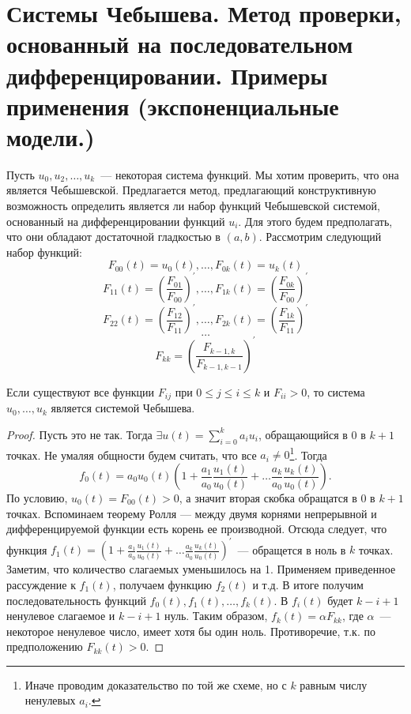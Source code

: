 
\section{Системы Чебышева. Метод проверки, основанный на последовательном дифференцировании. Примеры применения (экспоненциальные модели.)}

Пусть $u_0, u_2,…, u_k$ — некоторая система функций. Мы хотим проверить, что она является Чебышевской.
Предлагается метод, предлагающий конструктивную возможность определить является ли набор функций Чебышевской системой,
основанный на дифференцировании функций $u_i$. Для этого будем предполагать, что они обладают достаточной гладкостью в $(a, b)$.
Рассмотрим следующий набор функций:
$$ F_{00}(t) = u_0(t), …, F_{0k}(t) = u_k(t)$$
$$F_{11}(t) = \left(\frac{F_{01}}{F_{00}}\right)^{'}, …, F_{1k}(t) = \left(\frac{F_{0k}}{F_{00}}\right)^{'}$$
$$F_{22}(t) = \left(\frac{F_{12}}{F_{11}}\right)^{'}, …, F_{2k}(t) = \left(\frac{F_{1k}}{F_{11}}\right)^{'} $$
$$ … $$
$$F_{kk} = \left(\frac{F_{k-1, k}}{F_{k-1, k-1}}\right)^{'}$$
\begin{thm}
\label{seqDerTh}
Если существуют все функции $F_{ij}$ при $0 \le j \le i \le k$ и $F_{ii} > 0$, то система $u_0, …, u_k$ является системой Чебышева.
\end{thm}
\begin{proof}
    Пусть это не так. Тогда $\exists u(t) = \sum \limits_{i=0}^{k} a_i u_i$, обращающийся в 0 в $k+1$ точках. Не умаляя общности будем считать, что все $a_i \neq 0$\footnote{Иначе
    проводим доказательство по той же схеме, но с $k$ равным числу ненулевых $a_i$.}.
Тогда
$$ f_0(t) = a_0u_0(t)\left(1 + \frac{a_1}{a_0} \frac{u_1(t)}{u_0(t)} + … \frac{a_k}{a_0}\frac{u_k(t)}{u_0(t)}\right).$$
По условию, $u_0(t) = F_{00}(t) > 0$, а значит вторая скобка обращатся в 0 в $k+1$ точках. Вспоминаем теорему Ролля — между двумя корнями непрерывной и дифференцируемой функции есть корень ее производной. Отсюда следует, что функция 
$f_1(t) = \left(1 + \frac{a_1}{a_0} \frac{u_1(t)}{u_0(t)} + … \frac{a_k}{a_0}\frac{u_k(t)}{u_0(t)}\right)^{'}$ — обращется в ноль в $k$ точках. Заметим, что количество слагаемых уменьшилось на 1.
Применяем приведенное рассуждение к $f_1(t)$, получаем функцию $f_2(t)$ и т.д. В итоге получим 
последовательность функций $f_0(t), f_1(t), …, f_k(t)$.
В $f_i(t)$ будет $k-i+1$ ненулевое слагаемое и $k-i+1$ нуль.
Таким образом, $f_k(t) = \alpha F_{kk}$, где $\alpha$ — некоторое ненулевое число, имеет хотя бы один ноль. Противоречие, т.к. по предположению $F_{kk}(t) > 0$.
\end{proof}

